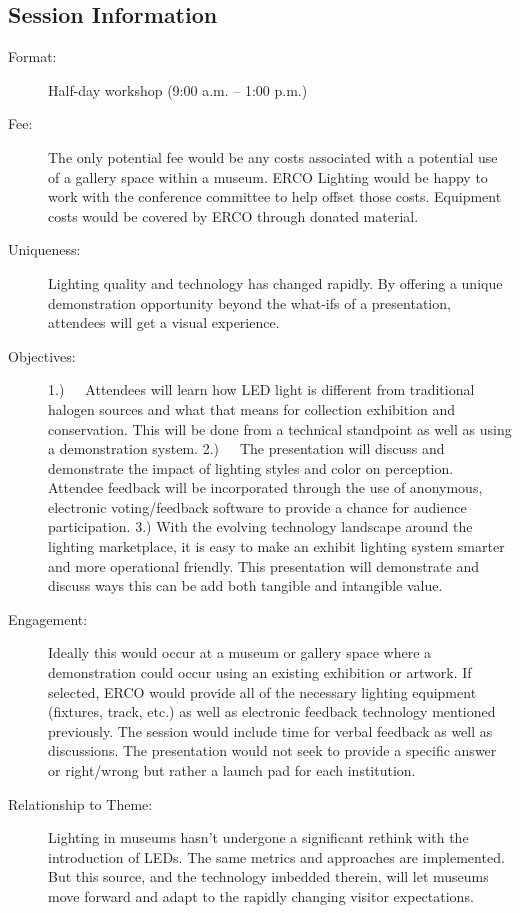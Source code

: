 \documentclass{report}
\begin{document}
              \subsection*{Session Information}
                \begin{description}
                  \item [Format:] Half-day workshop (9:00 a.m. – 1:00 p.m.)
							    
								  \item [Fee:]The only potential fee would be any costs associated with a potential use of a gallery space within a museum. ERCO Lighting would be happy to work with the conference committee to help offset those costs. Equipment costs would be covered by ERCO through donated material.
							     
							    \item [Uniqueness:]Lighting quality and technology has changed rapidly. By offering a unique demonstration opportunity beyond the what-ifs of a presentation, attendees will get a visual experience.
							    \item [Objectives:]1.)   Attendees will learn how LED light is different from traditional halogen sources and what that means for collection exhibition and conservation. This will be done from a technical standpoint as well as using a demonstration system.
2.)   The presentation will discuss and demonstrate the impact of lighting styles and color on perception. Attendee feedback will be incorporated through the use of anonymous, electronic voting/feedback software to provide a chance for audience participation.
3.)	With the evolving technology landscape around the lighting marketplace, it is easy to make an exhibit lighting system smarter and more operational friendly. This presentation will demonstrate and discuss ways this can be add both tangible and intangible value.
							    \item [Engagement:]Ideally this would occur at a museum or gallery space where a demonstration could occur using an existing exhibition or artwork. If selected, ERCO would provide all of the necessary lighting equipment (fixtures, track, etc.) as well as electronic feedback technology mentioned previously. The session would include time for verbal feedback as well as discussions. The presentation would not seek to provide a specific answer or right/wrong but rather a launch pad for each institution.
							    \item [Relationship to Theme:]Lighting in museums hasn’t undergone a significant rethink with the introduction of LEDs. The same metrics and approaches are implemented. But this source, and the technology imbedded therein, will let museums move forward and adapt to the rapidly changing visitor expectations.
							    

\end{description}
\end{document}

